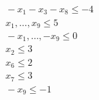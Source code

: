 \documentclass[a4paper,12pt]{article}
\begin{document}
\begin{adjustwidth}{-1.5cm}{}
\begin{tiny}
\[\begin{aligned}
\begin{aligned}
    & \quad -x_1 - x_3 - x_8 \leq -4 \\
    & \quad x_1, \dots, x_9 \leq 5 \\
    & \quad - x_1, \dots, - x_9 \leq 0 \\
    & \quad x_2 \leq 3 \\
    & \quad x_6 \leq 2 \\
    & \quad x_7 \leq 3 \\
    & \quad - x_9 \leq - 1
    \end{aligned}
\end{aligned}
\]
\end{tiny}
\end{adjustwidth}
\end{document}

